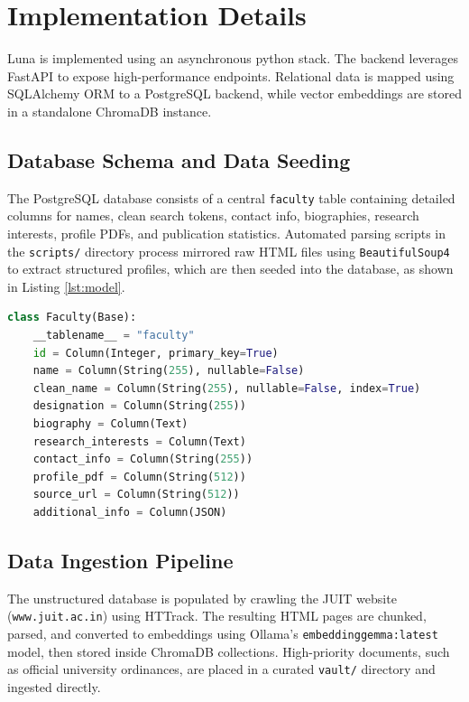 \documentclass[12pt,a4paper]{article}
\begin{document}
\newpage
\section{Implementation Details}
Luna is implemented using an asynchronous python stack. The backend leverages FastAPI to expose high-performance endpoints. Relational data is mapped using SQLAlchemy ORM to a PostgreSQL backend, while vector embeddings are stored in a standalone ChromaDB instance. 

\subsection{Database Schema and Data Seeding}
The PostgreSQL database consists of a central \texttt{faculty} table containing detailed columns for names, clean search tokens, contact info, biographies, research interests, profile PDFs, and publication statistics. Automated parsing scripts in the \texttt{scripts/} directory process mirrored raw HTML files using \texttt{BeautifulSoup4} to extract structured profiles, which are then seeded into the database, as shown in Listing \ref{lst:model}.

\begin{lstlisting}[language=Python, caption=SQLAlchemy Faculty Schema Definition, label=lst:model]
class Faculty(Base):
    __tablename__ = "faculty"
    id = Column(Integer, primary_key=True)
    name = Column(String(255), nullable=False)
    clean_name = Column(String(255), nullable=False, index=True)
    designation = Column(String(255))
    biography = Column(Text)
    research_interests = Column(Text)
    contact_info = Column(String(255))
    profile_pdf = Column(String(512))
    source_url = Column(String(512))
    additional_info = Column(JSON)
\end{lstlisting}

\subsection{Data Ingestion Pipeline}
The unstructured database is populated by crawling the JUIT website (\texttt{www.juit.ac.in}) using HTTrack. The resulting HTML pages are chunked, parsed, and converted to embeddings using Ollama's \texttt{embeddinggemma:latest} model, then stored inside ChromaDB collections. High-priority documents, such as official university ordinances, are placed in a curated \texttt{vault/} directory and ingested directly.
\end{document}
